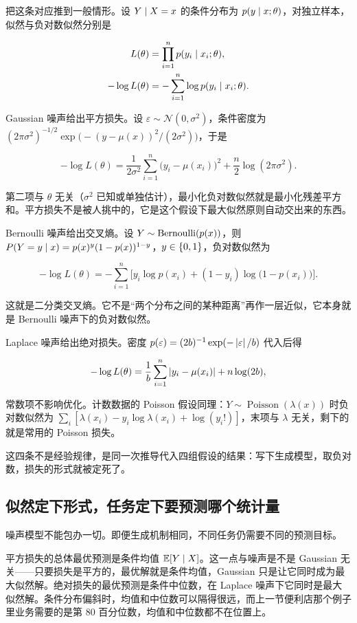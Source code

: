 把这条对应推到一般情形。设 \(Y\mid X=x\) 的条件分布为 \(p(y\mid x;\theta)\)，对独立样本，似然与负对数似然分别是

\[
\begin{aligned}
L(\theta)&=\prod_{i=1}^n p(y_i\mid x_i;\theta),\\
-\log L(\theta)&=-\sum_{i=1}^n\log p(y_i\mid x_i;\theta).
\end{aligned}
\]

Gaussian 噪声给出平方损失。设 \(\varepsilon\sim\mathcal N(0,\sigma^2)\)，条件密度为 \((2\pi\sigma^2)^{-1/2}\exp\bigl(-(y-\mu(x))^2/(2\sigma^2)\bigr)\)，于是

\[
-\log L(\theta)=\frac{1}{2\sigma^2}\sum_{i=1}^n\bigl(y_i-\mu(x_i)\bigr)^2+\frac n2\log(2\pi\sigma^2).
\]

第二项与 \(\theta\) 无关（\(\sigma^2\) 已知或单独估计），最小化负对数似然就是最小化残差平方和。平方损失不是被人挑中的，它是这个假设下最大似然原则自动交出来的东西。

Bernoulli 噪声给出交叉熵。设 \(Y\sim\operatorname{Bernoulli}(p(x))\)，则 \(P(Y=y\mid x)=p(x)^y(1-p(x))^{1-y}\)，\(y\in\left\{0,1\right\}\)，负对数似然为

\[
-\log L(\theta)=-\sum_{i=1}^n\bigl[y_i\log p(x_i)+(1-y_i)\log\bigl(1-p(x_i)\bigr)\bigr].
\]

这就是二分类交叉熵。它不是``两个分布之间的某种距离''再作一层近似，它本身就是 Bernoulli 噪声下的负对数似然。

Laplace 噪声给出绝对损失。密度 \(p(\varepsilon)=(2b)^{-1}\exp(-\left|\varepsilon\right|/b)\) 代入后得

\[
-\log L(\theta)=\frac1b\sum_{i=1}^n\left|y_i-\mu(x_i)\right|+n\log(2b),
\]

常数项不影响优化。计数数据的 Poisson 假设同理：\(Y\sim\operatorname{Poisson}(\lambda(x))\) 时负对数似然为 \(\sum_i[\lambda(x_i)-y_i\log\lambda(x_i)+\log(y_i!)]\)，末项与 \(\lambda\) 无关，剩下的就是常用的 Poisson 损失。

这四条不是经验规律，是同一次推导代入四组假设的结果：写下生成模型，取负对数，损失的形式就被定死了。

\subsection{似然定下形式，任务定下要预测哪个统计量}

噪声模型不能包办一切。即便生成机制相同，不同任务仍需要不同的预测目标。

平方损失的总体最优预测是条件均值 \(\mathbb{E}[Y\mid X]\)。这一点与噪声是不是 Gaussian 无关——只要损失是平方的，最优解就是条件均值，Gaussian 只是让它同时成为最大似然解。绝对损失的最优预测是条件中位数，在 Laplace 噪声下它同时是最大似然解。条件分布偏斜时，均值和中位数可以隔得很远，而上一节便利店那个例子里业务需要的是第 80 百分位数，均值和中位数都不在位置上。

